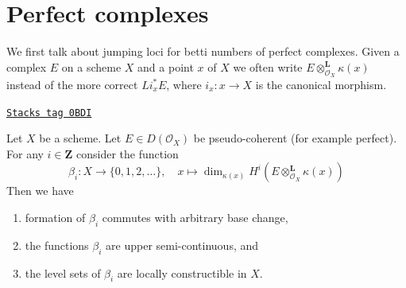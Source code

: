 \section{Perfect complexes}
\label{perfect-section-perfect-complexes}
We first talk about jumping loci for betti numbers of perfect complexes.
Given a complex $E$ on a scheme $X$ and a point $x$ of $X$ we often write
$E \otimes_{\mathcal{O}_X}^\mathbf{L} \kappa(x)$ instead of the more correct
$Li_x^*E$, where $i_x : x \to X$ is the canonical morphism.

\begin{lemma}
\label{perfect-lemma-jump-loci}
\href{https://stacks.math.columbia.edu/tag/0BDI}{\texttt{Stacks tag 0BDI}}

Let $X$ be a scheme. Let $E \in D(\mathcal{O}_X)$ be pseudo-coherent
(for example perfect). For any $i \in \mathbf{Z}$ consider the function
$$
\beta_i : X \longrightarrow \{0, 1, 2, \ldots\},\quad
x \longmapsto
\dim_{\kappa(x)}
H^i(E \otimes_{\mathcal{O}_X}^\mathbf{L} \kappa(x))
$$
Then we have
\begin{enumerate}
\item formation of $\beta_i$ commutes with arbitrary base change,
\item the functions $\beta_i$ are upper semi-continuous, and
\item the level sets of $\beta_i$ are locally constructible in $X$.
\end{enumerate}
\end{lemma}


